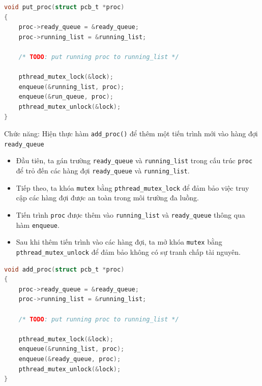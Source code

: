 \begin{lstlisting}[style=Cstyle,language=C]
void put_proc(struct pcb_t *proc)
{
    proc->ready_queue = &ready_queue;
    proc->running_list = &running_list;

    /* TODO: put running proc to running_list */

    pthread_mutex_lock(&lock);
    enqueue(&running_list, proc);
    enqueue(&run_queue, proc);
    pthread_mutex_unlock(&lock);
}
\end{lstlisting}


Chức năng: Hiện thực hàm \texttt{add\_proc()} để thêm một tiến trình mới vào hàng đợi \texttt{ready\_queue}

\begin{itemize}
    \item Đầu tiên, ta gán trường \texttt{ready\_queue} và \texttt{running\_list} trong cấu trúc \texttt{proc} để trỏ đến các hàng đợi \texttt{ready\_queue} và \texttt{running\_list}.
    \item Tiếp theo, ta khóa \texttt{mutex} bằng \texttt{pthread\_mutex\_lock} để đảm bảo việc truy cập các hàng đợi được an toàn trong môi trường đa luồng.
    \item Tiến trình \texttt{proc} được thêm vào \texttt{running\_list} và \texttt{ready\_queue} thông qua hàm \texttt{enqueue}.
    \item Sau khi thêm tiến trình vào các hàng đợi, ta mở khóa \texttt{mutex} bằng \texttt{pthread\_mutex\_unlock} để đảm bảo không có sự tranh chấp tài nguyên.
\end{itemize}

\begin{lstlisting}[style=Cstyle,language=C]
void add_proc(struct pcb_t *proc)
{
    proc->ready_queue = &ready_queue;
    proc->running_list = &running_list;

    /* TODO: put running proc to running_list */

    pthread_mutex_lock(&lock);
    enqueue(&running_list, proc);
    enqueue(&ready_queue, proc);
    pthread_mutex_unlock(&lock);
}
\end{lstlisting}


